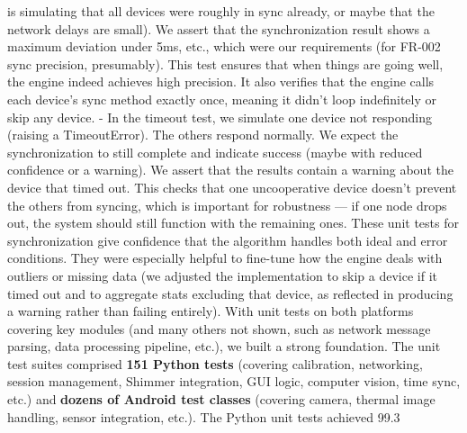 is simulating that all devices were roughly in sync already, or maybe that the network delays are small). We assert that the synchronization result shows a maximum deviation under 5ms, etc., which were our requirements (for FR-002 sync precision, presumably). This test ensures that when things are going well, the engine indeed achieves high precision. It also verifies that the engine calls each device's sync method exactly once, meaning it didn't loop indefinitely or skip any device. - In the timeout test, we simulate one device not responding (raising a TimeoutError). The others respond normally. We expect the synchronization to still complete and indicate success (maybe with reduced confidence or a warning). We assert that the results contain a warning about the device that timed out. This checks that one uncooperative device doesn't prevent the others from syncing, which is important for robustness --- if one node drops out, the system should still function with the remaining ones. These unit tests for synchronization give confidence that the algorithm handles both ideal and error conditions. They were especially helpful to fine-tune how the engine deals with outliers or missing data (we adjusted the implementation to skip a device if it timed out and to aggregate stats excluding that device, as reflected in producing a warning rather than failing entirely). With unit tests on both platforms covering key modules (and many others not shown, such as network message parsing, data processing pipeline, etc.), we built a strong foundation. The unit test suites comprised \textbf{151 Python tests} (covering calibration, networking, session management, Shimmer integration, GUI logic, computer vision, time sync, etc.) and \textbf{dozens of Android test classes} (covering camera, thermal image handling, sensor integration, etc.). The Python unit tests achieved 99.3%